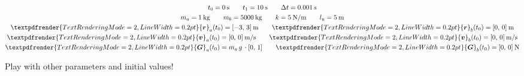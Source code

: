 \documentclass[a4paper,12pt,%
onecolumn,oneside,%
british%
]{memoir}
\renewcommand*{\bm}[1]{\textpdfrender{TextRenderingMode=2,LineWidth=0.2pt}{\boldsymbol{#1}}}
\newcommand*{\incr}{\Delta}%
\renewcommand*{\|}[1][]{\nonscript\:#1\vert\nonscript\:\mathopen{}}
\newcommand*{\yr}{\bm{r}}
\newcommand*{\yra}{\yr_{a}}
\newcommand*{\yrb}{\yr_{b}}
\newcommand*{\yv}{\bm{v}}
\newcommand*{\yva}{\yv_{a}}
\newcommand*{\yvb}{\yv_{b}}
\newcommand*{\ylo}{l_{\textrm{n}}}
\newcommand*{\yti}{t_{0}}
\newcommand*{\ytf}{t_{1}}
\newcommand*{\Dt}{\incr t}
\newcommand*{\yM}{m}%
\newcommand*{\yMa}{\yM_{a}}
\newcommand*{\yMb}{\yM_{b}}
\newcommand*{\yG}{\bm{G}}
\newcommand*{\yGa}{\yG_{a}}
\newcommand*{\yGb}{\yG_{b}}
\begin{document}
\begin{exercise}[label={ex:nonhooke}]
\begin{description}[itemsep=\baselineskip]
  \item[Set 4:]
        \begin{equation*}
      \begin{gathered}
        \yti=\qty{0}{s}
        \qquad
        \ytf=\qty{10}{s}
        \qquad
        \Dt = \qty{0.001}{s}
        \\
        \yMa=\qty{1}{kg}
        \qquad
        \yMb=\qty{5000}{kg}
        \qquad
        k=\qty{5}{N/m}
        \qquad
        \ylo = \qty{5}{m}
        \\
        \yra(\yti)=[\num{-3},\, \num{3}]\:\unit{m}
        \qquad
        \yrb(\yti)=[\num{0},\, \num{0}]\:\unit{m}
        \\
        \yva(\yti)=[\num{0},\, \num{0}]\:\unit{m/s}
        \qquad
        \yvb(\yti)=[\num{0},\, \num{0}]\:\unit{m/s}
        \\
        \yGa(\yti)= \yMa\,g\,\cdot[0,\, 1]
        \qquad
        \yGb(\yti)=[\num{0},\, \num{0}]\:\unit{N}
      \end{gathered}
    \end{equation*}
  \end{description}

  Play with other parameters and initial values!
\end{exercise}
\end{document}
